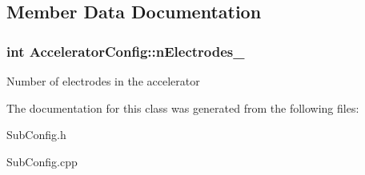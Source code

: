 \subsection{Member Data Documentation}
\hypertarget{classAcceleratorConfig_af60eff50588b2990eb9020780a56362b}{
\subsubsection[{n\+Electrodes\+\_\+}]{\setlength{\rightskip}{0pt plus 5cm}int Accelerator\+Config\+::n\+Electrodes\+\_\+\hspace{0.3cm}{\ttfamily [protected]}}}\label{classAcceleratorConfig_af60eff50588b2990eb9020780a56362b}
Number of electrodes in the accelerator 

The documentation for this class was generated from the following files\+:\begin{DoxyCompactItemize}
\item 
Sub\+Config.\+h\item 
Sub\+Config.\+cpp\end{DoxyCompactItemize}
